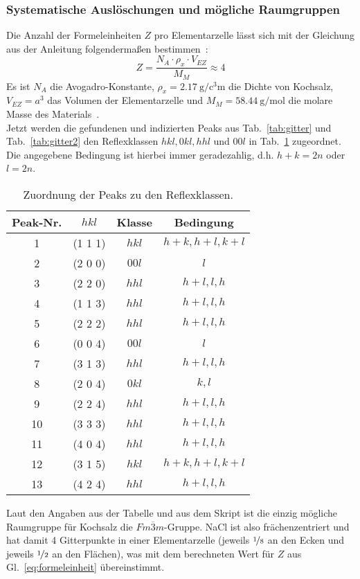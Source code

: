 \subsubsection{Systematische Auslöschungen und mögliche Raumgruppen}
Die Anzahl der Formeleinheiten $Z$ pro Elementarzelle lässt sich mit der Gleichung aus der Anleitung folgendermaßen bestimmen~\cite[]{Anleitung}:
\begin{equation}\label{eq:formeleinheit}
    Z = \frac{N_A \cdot \rho_x \cdot V_{EZ}}{M_M} \approx 4
\end{equation}
Es ist $N_A$ die Avogadro-Konstante, $\rho_x = \SI{2,17}[]{\gram \per \cubic \centi\metre}$ die Dichte von Kochsalz, $V_{EZ} = a^3$ das Volumen der Elementarzelle und $M_M = \SI{58,44}[]{\gram \per \mol}$ die molare Masse des Materials~\cite[]{Anleitung}.\\
Jetzt werden die gefundenen und indizierten Peaks aus Tab.~\ref{tab:gitter} und Tab.~\ref{tab:gitter2} den Reflexklassen $hkl, 0kl, hhl $ und $00l$ in Tab.~\ref{tab:zuordnung} zugeordnet. Die angegebene Bedingung ist hierbei immer geradezahlig, d.h. $h+k = 2n$ oder $l = 2n$.

\begin{table}[h!]
    \centering
     \begin{tabular}{|c|c|c|c|} 
     \hline
     Peak-Nr. &  $h k l$ & Klasse & Bedingung\\ [0.5ex] 
     \hline\hline
     1 & (1 1 1) & $hkl$ &  $h+k, h+l, k+l$ \\
     2 & (2 0 0) & $00l$ & $l$\\
     3 & (2 2 0) & $hhl$ &  $h+l, l, h$\\
     4 & (1 1 3) & $hhl$ & $h+l, l, h$\\
     5 & (2 2 2) & $hhl$ & $h+l, l, h$\\
     6 & (0 0 4) & $00l$ & $l$\\
     7 & (3 1 3)& $hhl$ & $h+l, l, h$\\
     8 & (2 0 4) & $0kl$ & $k, l$\\
     9 & (2 2 4) & $hhl$ & $h+l, l, h$\\
     10 & (3 3 3) & $hhl$ & $h+l, l, h$\\
     11 & (4 0 4) & $hhl$ & $h+l, l, h$\\
     12 & (3 1 5) & $hkl$ & $h+k, h+l, k+l$\\
     13 & (4 2 4) & $hhl$ & $h+l, l, h$\\  [1ex]
     \hline
    
     \end{tabular}
     \caption[short]{Zuordnung der Peaks zu den Reflexklassen.}
     \label{tab:zuordnung}
\end{table}

Laut den Angaben aus der Tabelle und aus dem Skript ist die einzig mögliche Raumgruppe für Kochsalz die $Fm\overline{3}m$-Gruppe. NaCl ist also frächenzentriert und hat damit 4 Gitterpunkte in einer Elementarzelle (jeweils $\nicefrac[]{1}{8}$ an den Ecken und jeweils $\nicefrac{1}{2}$ an den Flächen), was mit dem berechneten Wert für $Z$ aus Gl.~\ref{eq:formeleinheit} übereinstimmt.\\